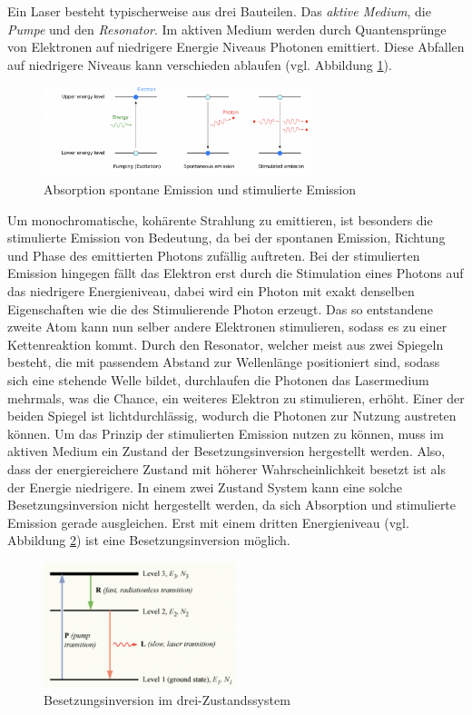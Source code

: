 Ein Laser besteht typischerweise aus drei Bauteilen. Das \textit{aktive Medium}, die \textit{Pumpe} und den \textit{Resonator}.
Im aktiven Medium werden durch Quantensprünge von Elektronen auf niedrigere Energie Niveaus Photonen emittiert.
Diese Abfallen auf niedrigere Niveaus kann verschieden ablaufen (vgl. Abbildung \ref{fig:emmision}).
\begin{figure}[h]
    \centering
    \includegraphics[width=0.7\textwidth]{abb/emission.png}
    \caption{Absorption spontane Emission und stimulierte Emission \cite{emission}}
    \label{fig:emmision}
\end{figure}
Um monochromatische, kohärente Strahlung zu emittieren, ist besonders die stimulierte Emission von Bedeutung,
da bei der spontanen Emission, Richtung und Phase des emittierten Photons zufällig auftreten.
Bei der stimulierten Emission hingegen fällt das Elektron erst durch die Stimulation eines Photons auf das niedrigere Energieniveau,
dabei wird ein Photon mit exakt denselben Eigenschaften wie die des Stimulierende Photon erzeugt.
Das so entstandene zweite Atom kann nun selber andere Elektronen stimulieren,
sodass es zu einer Kettenreaktion kommt. 
Durch den Resonator, 
welcher meist aus zwei Spiegeln besteht,
die mit passendem Abstand zur Wellenlänge positioniert sind,
sodass sich eine stehende Welle bildet,
durchlaufen die Photonen das Lasermedium mehrmals,
was die Chance, ein weiteres Elektron zu stimulieren, erhöht. 
Einer der beiden Spiegel ist lichtdurchlässig, wodurch die Photonen zur Nutzung austreten können.
Um das Prinzip der stimulierten Emission nutzen zu können,
muss im aktiven Medium ein Zustand der Besetzungsinversion hergestellt werden.
Also, 
dass der energiereichere Zustand mit höherer Wahrscheinlichkeit besetzt ist als der Energie niedrigere.
In einem zwei Zustand System kann eine solche Besetzungsinversion nicht hergestellt werden,
da sich Absorption und stimulierte Emission gerade ausgleichen. 
Erst mit einem dritten Energieniveau (vgl. Abbildung \ref{fig:dreiniveau}) ist eine Besetzungsinversion möglich.
\begin{figure}[h]
    \centering
    \includegraphics[width=0.5\textwidth]{abb/dreiniveau.png}
    \caption{Besetzungsinversion im drei-Zustandssystem \cite{enwiki}}
    \label{fig:dreiniveau}
\end{figure}
